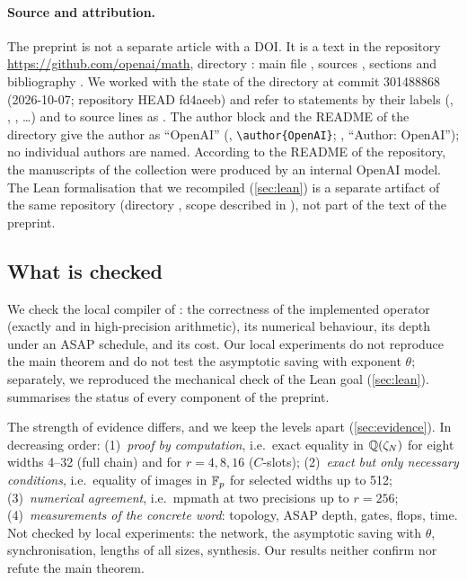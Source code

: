 \documentclass[11pt]{article}
\theoremstyle{plain}
\begin{document}
\paragraph{Source and attribution.}
The preprint is not a separate article with a DOI. It is a text in the repository \url{https://github.com/openai/math}, directory : main file , sources , sections  and bibliography . We worked with the state of the directory at commit 301488868 (2026-10-07; repository HEAD fd4aeeb) and refer to statements by their labels (, , , \dots) and to source lines as . The author block and the README of the directory give the author as ``OpenAI'' (, \verb|\author{OpenAI}|; , ``Author: OpenAI''); no individual authors are named. According to the README of the repository, the manuscripts of the collection were produced by an internal OpenAI model. The Lean formalisation that we recompiled (\cref{sec:lean}) is a separate artifact of the same repository (directory , scope described in ), not part of the text of the preprint.

\subsection{What is checked}
We check the local compiler of : the correctness of the implemented operator (exactly and in high-precision arithmetic), its numerical behaviour, its depth under an ASAP schedule, and its cost. Our local experiments do not reproduce the main theorem and do not test the asymptotic saving with exponent $\theta$; separately, we reproduced the mechanical check of the Lean goal (\cref{sec:lean}).  summarises the status of every component of the preprint.

The strength of evidence differs, and we keep the levels apart (\cref{sec:evidence}). In decreasing order: (1)~\emph{proof by computation}, i.e.\ exact equality in $\mathbb{Q}(\zeta_N)$ for eight widths 4--32 (full chain) and for $r=4,8,16$ ($C$-slots); (2)~\emph{exact but only necessary conditions}, i.e.\ equality of images in $\mathbb{F}_p$ for selected widths up to 512; (3)~\emph{numerical agreement}, i.e.\ mpmath at two precisions up to $r=256$; (4)~\emph{measurements of the concrete word}: topology, ASAP depth, gates, flops, time. Not checked by local experiments: the network, the asymptotic saving with $\theta$, synchronisation, lengths of all sizes, synthesis. Our results neither confirm nor refute the main theorem.
\end{document}
